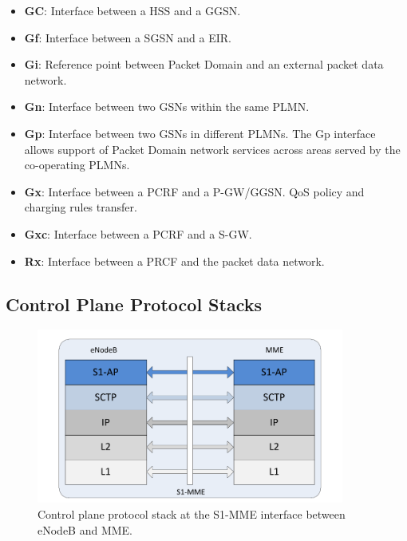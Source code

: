 \begin{itemize}
\item \textbf{GC}: Interface between a HSS and a GGSN.
\item \textbf{Gf}: Interface between a SGSN and a EIR.
\item \textbf{Gi}: Reference point between Packet Domain and an external packet data network.
\item \textbf{Gn}: Interface between two GSNs within the same PLMN.
\item \textbf{Gp}: Interface between two GSNs in different PLMNs. The Gp interface allows support of Packet Domain network services across areas served by the co-operating PLMNs.
\item \textbf{Gx}: Interface between a PCRF and a P-GW/GGSN. QoS policy and charging rules transfer.
\item \textbf{Gxc}: Interface between a PCRF and a S-GW.

\item \textbf{Rx}: Interface between a PRCF and the packet data network.
\end{itemize}



\subsection{Control Plane Protocol Stacks}

\begin{figure}[htbp]
	\centering
 	\includegraphics[width=0.9\textwidth]{images/eNB-MME-layers.pdf}
 	\caption{Control plane protocol stack at the S1-MME interface between eNodeB and MME.}
 	\label{c4:fig:stack-enbmme}
\end{figure}

